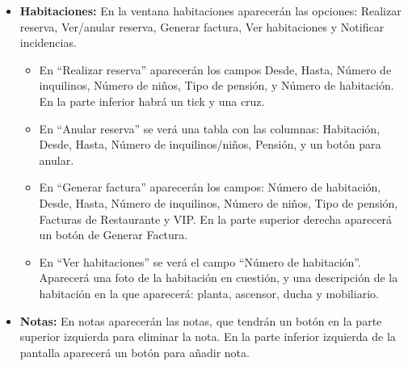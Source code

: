 \documentclass[spanish,a4paper,11pt, twoside]{report}	%
\begin{document}
\begin{itemize}
\begin{itemize}
					 \item \textbf{Habitaciones:} En la ventana habitaciones aparecerán las opciones: Realizar reserva, Ver/anular reserva, Generar factura, Ver habitaciones y Notificar incidencias. 
					\begin{itemize}		
							\item En “Realizar reserva'' aparecerán los campos Desde, Hasta, Número de inquilinos, Número de niños, Tipo de pensión, y Número de habitación. En la parte inferior habrá un tick y una cruz.
							\item En “Anular reserva'' se verá una tabla con las columnas: Habitación, Desde, Hasta, Número de inquilinos/niños, Pensión, y un botón para anular.\\
							\item En “Generar factura'' aparecerán los campos: Número de habitación, Desde, Hasta, Número de inquilinos, Número de niños, Tipo de pensión, Facturas de Restaurante y VIP. En la parte superior derecha aparecerá un botón de Generar Factura. \\
							\item En “Ver habitaciones'' se verá el campo “Número de habitación''. Aparecerá una foto de la habitación en cuestión, y una descripción de la habitación en la que aparecerá: planta, ascensor, ducha y mobiliario. 
					\end{itemize}
					 \item \textbf{Notas:} En notas aparecerán las notas, que tendrán un botón en la parte superior izquierda para eliminar la nota. En la parte inferior izquierda de la pantalla aparecerá un botón para añadir nota. 
				\end{itemize}
				

\end{itemize}
\end{document}
